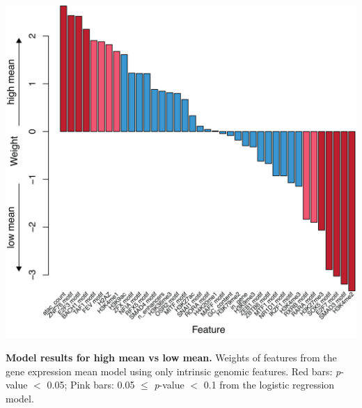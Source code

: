 \begin{suppfigure}[p]  
    \centering
    \includegraphics[width=\linewidth]{figures/cas/cas_suppfigure3.png}
    \caption[Model results for high mean vs low mean.]{
        \textbf{Model results for high mean vs low mean.}
        Weights of features from the gene expression mean model using only intrinsic genomic features. Red bars: \textit{p}-value $<$ 0.05; Pink bars: 0.05 $\leq$ \textit{p}-value $<$ 0.1 from the logistic regression model.  
    }
    \label{fig:cas_figureS3}
\end{suppfigure}

